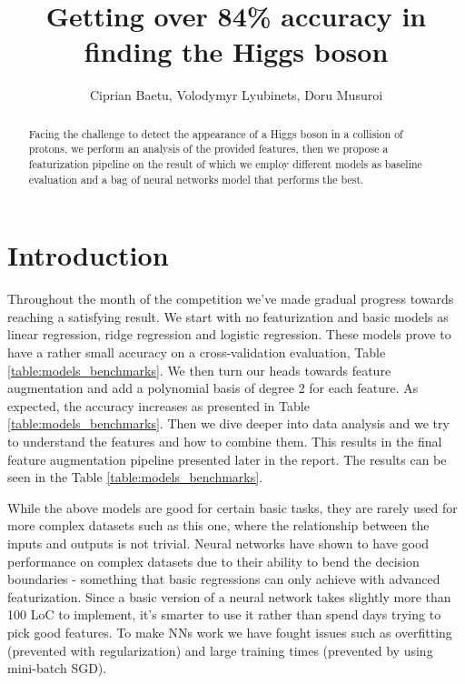 \documentclass[10pt,conference,compsocconf]{IEEEtran}
\begin{document}
\title{Getting over 84\% accuracy in finding the Higgs boson}

\author{
	Ciprian Baetu, Volodymyr Lyubinets, Doru Musuroi
}

\maketitle

\begin{abstract}
Facing the challenge to detect the appearance of a Higgs boson in a collision of protons, we perform an analysis of the provided features, then we propose a featurization pipeline on the result of which we employ different models as baseline evaluation and a bag of neural networks model that performs the best.
\end{abstract}

\section{Introduction}
Throughout the month of the competition we've made gradual progress towards reaching a satisfying result. 
We start with no featurization and basic models as linear regression, ridge regression and logistic regression. These models prove to have a rather small accuracy on a cross-validation evaluation, Table \ref{table:models_benchmarks}. 
We then turn our heads towards feature augmentation and add a polynomial basis of degree 2 for each feature. As expected, the accuracy increases as presented in Table \ref{table:models_benchmarks}. 
Then we dive deeper into data analysis and we try to understand the features and how to combine them. This results in the final feature augmentation pipeline presented later in the report. The results can be seen in the Table \ref{table:models_benchmarks}. 

While the above models are good for certain basic tasks, they are rarely used for more complex datasets such as this one, where the relationship between the inputs and outputs is not trivial. Neural networks have shown to have good performance on complex datasets due to their ability to bend the decision boundaries - something that basic regressions can only achieve with advanced featurization. Since a basic version of a neural network takes slightly more than 100 LoC to implement, it's smarter to use it rather than spend days trying to pick good features. To make NNs work we have fought issues such as overfitting (prevented with regularization) and large training times (prevented by using mini-batch SGD).
\end{document}
